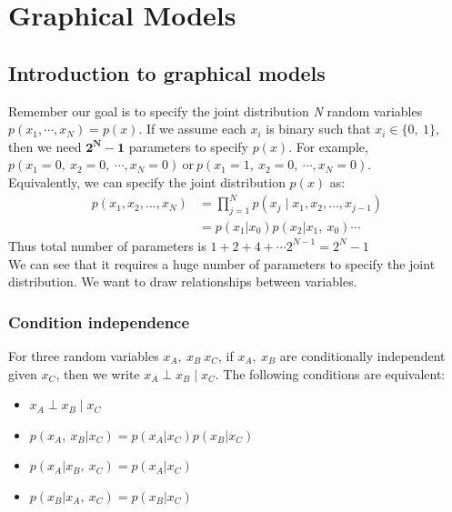 \section{Graphical Models}
\label{sec:graphical-models}

\subsection{Introduction to graphical models}
Remember our goal is to specify the joint distribution \textit{N} random variables $p(x_1,\cdots,x_N)=p(x)$. If we assume each $x_i$ is binary such that $x_i\in\{0,\:1\}$, then we need $\mathbf{2^N-1}$ parameters to specify $p(x)$. For example, $p(x_1=0,\:x_2=0,\:\cdots,x_N=0)\:\text{or}\:p(x_1=1,\:x_2=0,\:\cdots,x_N=0)$.\\ Equivalently, we can specify the joint distribution $p(x)$ as:
\begin{align*}
    p\left(x_1, x_2, \ldots, x_N\right)&=\prod_{j=1}^N p\left(x_j \mid x_1, x_2, \ldots, x_{j-1}\right)\\
    &=p(x_1|x_0)p(x_2|x_1,\:x_0)\cdots
\end{align*}
Thus total number of parameters is $1+2+4+\cdots2^{N-1}=2^N-1$\\
We can see that it requires a huge number of parameters to specify the joint distribution. We want to draw relationships between variables.
\subsubsection*{Condition independence}
For three random variables $x_A,\:x_B\:x_C$, if $x_A,\:x_B$ are conditionally independent given $x_C$, then we write $x_A\perp x_B\mid x_C$. The following conditions are equivalent:
\begin{itemize}
    \item $x_A\perp x_B\mid x_C$
    \item $p(x_A,\:x_B|x_C)=p(x_A|x_C)p(x_B|x_C)$
    \item $p(x_A|x_B,\:x_C)=p(x_A|x_C)$
    \item $p(x_B|x_A,\:x_C)=p(x_B|x_C)$
\end{itemize}
